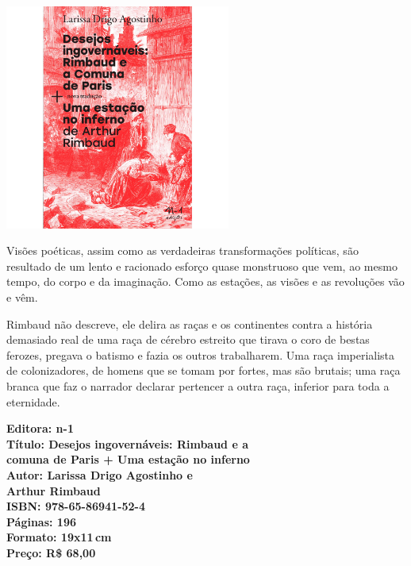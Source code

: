 \pagebreak

\begin{center}
\hspace*{-3.6cm}
\hspace*{3.1cm}\includegraphics[width=74mm]{./CAPAS/N-1_RIMBAUD.jpg}
\end{center}

\hspace*{-7cm}\hrulefill\hspace*{-7cm}

\medskip

\noindent{}Visões poéticas, assim como as verdadeiras transformações políticas, são resultado de um lento e racionado esforço quase monstruoso que vem, ao mesmo tempo, do corpo e da imaginação. Como as estações, as visões e as revoluções vão e vêm.

 Rimbaud não descreve, ele delira as raças e os continentes contra a história demasiado real de uma raça de cérebro estreito que tirava o coro de bestas ferozes, pregava o batismo e fazia os outros trabalharem. Uma raça imperialista de colonizadores, de homens que se tomam por fortes, mas são brutais; uma raça branca que faz o narrador declarar pertencer a outra raça, inferior para toda a eternidade.
\vfill

\hspace*{-.4cm}\begin{minipage}[c]{1\linewidth}
\small\textbf{
\hspace*{-.1cm}Editora: n-1\\
Título: Desejos ingovernáveis: Rimbaud e a\\comuna de Paris + Uma estação no inferno\\
Autor: Larissa Drigo Agostinho e\\Arthur Rimbaud\\
ISBN: 978-65-86941-52-4\\
Páginas: 196\\
Formato: 19x11\,cm\\
Preço: R\$ 68,00\\
}
\end{minipage}

